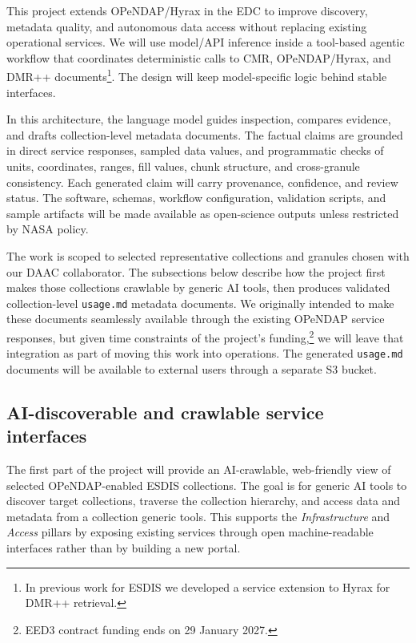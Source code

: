 \documentclass[11pt]{article}
\begin{document}
This project extends \acs{OPeNDAP}/Hyrax in the \ac{EDC} to improve discovery, metadata
quality, and autonomous data access without replacing existing operational
services. We will use model/API inference inside a tool-based agentic workflow
that coordinates deterministic calls to \ac{CMR}, \acs{OPeNDAP}/Hyrax, and
\ac{DMR++} documents\footnote{In previous work for \ac{ESDIS} we developed a
service extension to Hyrax for \ac{DMR++} retrieval.}. The design will keep
model-specific logic behind stable interfaces.

In this architecture, the language model guides inspection, compares evidence,
and drafts collection-level metadata documents. The factual claims are grounded
in direct service responses, sampled data values, and programmatic checks of
units, coordinates, ranges, fill values, chunk structure, and cross-granule
consistency. Each generated claim will carry provenance, confidence, and review
status. The software, schemas, workflow configuration, validation scripts, and
sample artifacts will be made available as open-science outputs unless
restricted by NASA policy.

The work is scoped to selected representative collections and granules chosen
with our \ac{DAAC} collaborator. The subsections below describe how the project
first makes those collections crawlable by generic \ac{AI} tools, then produces
validated collection-level \texttt{usage.md} metadata documents. We originally
intended to make these documents seamlessly available through the existing
\ac{OPeNDAP} service responses, but given time constraints of the project's
funding,\footnote{EED3 contract funding ends on 29 January 2027.} we will leave that
integration as part of moving this work into operations. The generated
\texttt{usage.md} documents will be available to external users through a
separate S3 bucket.

\subsection{AI-discoverable and crawlable service interfaces}
\label{section-2.1}

The first part of the project will provide an \ac{AI}-crawlable, web-friendly
view of selected \acs{OPeNDAP}-enabled \ac{ESDIS} collections. The goal is for
generic \ac{AI} tools to discover target collections, traverse the collection
hierarchy, and access data and metadata from a collection generic tools. This
supports the {\em Infrastructure} and {\em Access} pillars by exposing existing services
through open machine-readable interfaces rather than by building a new portal.
\end{document}
